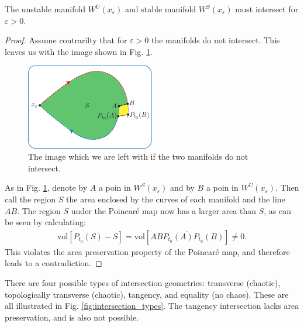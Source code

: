 \begin{proposition}[]
	The unstable manifold $W^{U}(x_{\varepsilon})$ and stable manifold $W^{S}(x_{\varepsilon})$ must intersect for $\varepsilon>0$.
\end{proposition}
\begin{proof}
	Assume contrarilty that for $\varepsilon>0$ the manifolds do not intersect. This leaves us with the image shown in Fig. \ref{fig:contradiction_assumption}.
	\begin{figure}[h!]
		\centering
		\includegraphics[width=0.5\textwidth]{figures/ch8/9contradiction_assumption.pdf}
		\caption{The image which we are left with if the two manifolds do not intersect.}
		\label{fig:contradiction_assumption}
	\end{figure}

	As in Fig. \ref{fig:contradiction_assumption}, denote by $A$ a poin in $ W^{S}(x_\varepsilon)$ and by $B$ a poin in $W^{U}(x_{\varepsilon})$. Then call the region $S$ the area enclosed by the curves of each manifold and the line $AB$. The region $S$ under the  Poincaré map now has a larger area than $S$, as can be seen by calculating:
\begin{align}
	\textrm{vol}[P_{t_0}(S) - S] =  \textrm{vol} [\overline{ABP_{t_0}(A)P_{t_0}(B)}] \neq 0.
\end{align}
This violates the area preservation property of the Poincaré map, and therefore leads to a contradiction.
\end{proof}

There are four possible types of intersection geometries: transverse (chaotic), topologically transverse (chaotic), tangency, and equality (no chaos). These are all illustrated in Fig. \ref{fig:intersection_types}. The tangency intersection lacks area preservation, and is also not possible.


